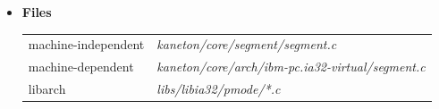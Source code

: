 \begin{itemize}
             {
               This function reads  bytes at offset
                from the segment .
             }

              {
		This function write the data of  into the
		segment .
              }

             {
               This function copies data from the segment  to
               the segment .
             }

             {
               This function changes the permissions of the segment .
             }

  \item {\bf {Files}}\\

    \begin{tabular}{| l | l |}
      \hline
      machine-independent & {\em kaneton/core/segment/segment.c}\\
      machine-dependent & {\em kaneton/core/arch/ibm-pc.ia32-virtual/segment.c}\\
      libarch & {\em libs/libia32/pmode/*.c}\\\hline
    \end{tabular}
\end{itemize}


%
%

\newpage

